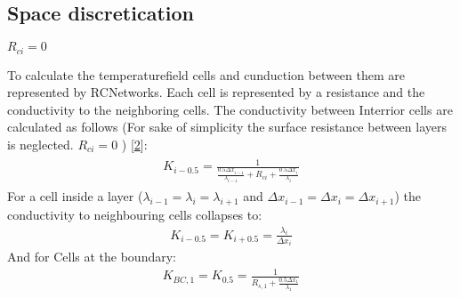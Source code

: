 \documentclass[letterpaper,10pt,english]{jupyterBook}
\begin{document}
\subsection{Space discretication}
\label{\detokenize{Aufgabe1:space-discretication}}
\sphinxAtStartPar
\(R_{ci} =0\)

\sphinxAtStartPar
To calculate the temperaturefield cells and cunduction between them are represented by RC\sphinxhyphen{}Networks. Each cell is represented by a resistance and the conductivity to the neighboring cells. The conductivity between Interrior cells are calculated as follows (For sake of simplicity the surface resistance between layers is neglected. \( R_{ci} =0 \) ) {[}\hyperlink{cite.Aufgabe1:id7}{2}{]}:
\begin{equation}\label{equation:Aufgabe1:conductivityInterior}
\begin{split}\begin{align}
 K_{i-0.5} = \frac{1}{\frac{0.5 \Delta x_{i-1}}{\lambda_{i-1}} + R_{ci} + \frac{0.5 \Delta x_{i}}{\lambda_{i}}} 
\end{align}\end{split}
\end{equation}
\sphinxAtStartPar
For a cell inside a layer (\(\lambda_{i-1} = \lambda_{i} = \lambda_{i+1}\) and \(\Delta x_{i-1} = \Delta x_{i} = \Delta x_{i+1}\)) the conductivity to neighbouring cells collapses to:
\begin{equation}\label{equation:Aufgabe1:conductivityInterior2}
\begin{split}K_{i-0.5} = K_{i+0.5} = \frac{\lambda_{i}}{\Delta x_{i}}\end{split}
\end{equation}
\sphinxAtStartPar
And for Cells at the boundary:
\begin{equation}\label{equation:Aufgabe1:conductivityExterior}
\begin{split}K_{BC,1} = K_{0.5} = \frac{1}{R_{s,1} + \frac{0.5 \Delta x_{1}}{\lambda_{1}}}\end{split}
\end{equation}
\end{document}
